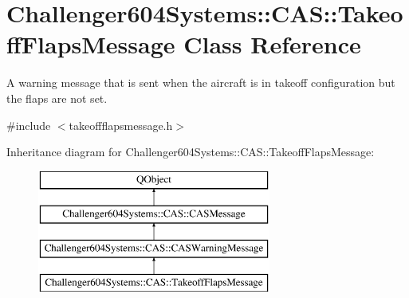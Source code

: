 \hypertarget{class_challenger604_systems_1_1_c_a_s_1_1_takeoff_flaps_message}{\section{Challenger604\-Systems\-:\-:C\-A\-S\-:\-:Takeoff\-Flaps\-Message Class Reference}
\label{class_challenger604_systems_1_1_c_a_s_1_1_takeoff_flaps_message}
}


A warning message that is sent when the aircraft is in takeoff configuration but the flaps are not set.  




{\ttfamily \#include $<$takeoffflapsmessage.\-h$>$}

Inheritance diagram for Challenger604\-Systems\-:\-:C\-A\-S\-:\-:Takeoff\-Flaps\-Message\-:\begin{figure}[H]
\begin{center}
\leavevmode
\includegraphics[height=4.000000cm]{class_challenger604_systems_1_1_c_a_s_1_1_takeoff_flaps_message}
\end{center}
\end{figure}
